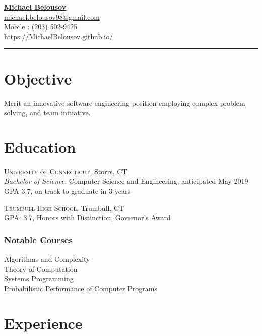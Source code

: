 \documentclass[Letterpaper,11pt]{article}
\begin{document}
\setlength{\parindent}{0em}
\setlength{\parskip}{1em}
\setlength{\parsep}{1em}
\setlength{\itemsep}{0.2em}
\setlength{\headsep}{0.2em}
\setlength{\topskip}{0.2em}
\setlength{\topmargin}{0.2em}
\setlength{\topsep}{0.2em}
\setlength{\partopsep}{0.2em}
\setlength{\columnsep}{1em}

\addtolength{\topmargin}{-2em}

\textbf{\href{mailto:michael.belousov98@gmail.com}{\Large Michael Belousov}}\\
\href{mailto:michael.belousov98@gmail.com}{michael.belousov98@gmail.com}\\
Mobile : (203) 502-9425\\
\href{https://MichaelBelousov.github.io/}{https://MichaelBelousov.github.io/}\\
\hrule

\section*{Objective}

Merit an innovative software engineering position employing complex problem solving, and team initiative.

\section*{Education}

    \textsc{University of Connecticut}, Storrs, CT\\
    \textit{Bachelor of Science}, Computer Science and Engineering, anticipated May 2019\\
    GPA 3.7, on track to graduate in 3 years

    \textsc{Trumbull High School}, Trumbull, CT\\
    GPA: 3.7, Honors with Distinction, Governor's Award

    \subsubsection*{Notable Courses}
    Algorithms and Complexity\\
    Theory of Computation\\
    Systems Programming\\
    Probabilistic Performance of Computer Programs

\section*{Experience}
\end{document}
